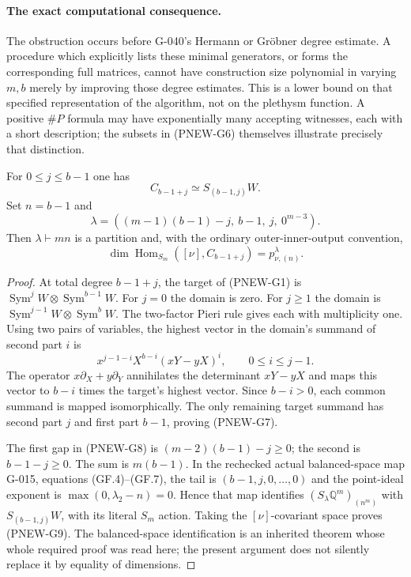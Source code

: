 \paragraph{The exact computational consequence.}
The obstruction occurs before G-040's Hermann or Gr\"obner degree
estimate.  A procedure which explicitly lists these minimal
generators, or forms the corresponding full matrices, cannot
have construction size polynomial in varying $m,b$ merely by
improving those degree estimates.  This is a lower bound on that
specified representation of the algorithm, not on the
plethysm function.  A positive $\#P$ formula may have
exponentially many accepting witnesses, each with a short
description; the subsets in (PNEW-G6) themselves illustrate
precisely that distinction.

\begin{proposition}
For $0\le j\le b-1$ one has
\[
 C_{b-1+j}\simeq S_{(b-1,j)}W.
 \tag{PNEW-G7}
\]
Set $n=b-1$ and
\[
 \lambda=((m-1)(b-1)-j,\ b-1,\ j,\ 0^{m-3}).
 \tag{PNEW-G8}
\]
Then $\lambda\vdash mn$ is a partition and, with the ordinary
outer-inner-output convention,
\[
 \dim\operatorname{Hom}_{S_m}([\nu],C_{b-1+j})
           =p_{\nu,(n)}^{\lambda}.
 \tag{PNEW-G9}
\]
\end{proposition}
\begin{proof}
At total degree $b-1+j$, the target of (PNEW-G1) is
$\operatorname{Sym}^{j}W\otimes\operatorname{Sym}^{b-1}W$.
For $j=0$ the domain is zero.  For $j\ge1$ the domain is
$\operatorname{Sym}^{j-1}W\otimes\operatorname{Sym}^{b}W$.
The two-factor Pieri rule gives each with multiplicity one.
Using two pairs of variables, the highest vector in the domain's
summand of second part $i$ is
\[
 x^{j-1-i}X^{b-i}(xY-yX)^i,
 \qquad 0\le i\le j-1.
\]
The operator $x\partial_X+y\partial_Y$ annihilates the determinant
$xY-yX$ and maps this vector to $b-i$ times the target's
highest vector.  Since $b-i>0$, each common summand is mapped
isomorphically.  The only remaining target summand has second
part $j$ and first part $b-1$, proving (PNEW-G7).

The first gap in (PNEW-G8) is
$(m-2)(b-1)-j\ge0$; the second is $b-1-j\ge0$.
The sum is $m(b-1)$.  In the rechecked actual balanced-space
map G-015, equations (GF.4)--(GF.7), the tail is
$(b-1,j,0,\ldots,0)$ and the point-ideal exponent is
$\max(0,\lambda_2-n)=0$.  Hence that map identifies
$(S_\lambda\mathbb Q^m)_{(n^m)}$ with $S_{(b-1,j)}W$,
with its literal $S_m$ action.  Taking the $[\nu]$-covariant
space proves (PNEW-G9).  The balanced-space identification is
an inherited theorem whose whole required proof was read here;
the present argument does not silently replace it by equality
of dimensions.
\end{proof}

